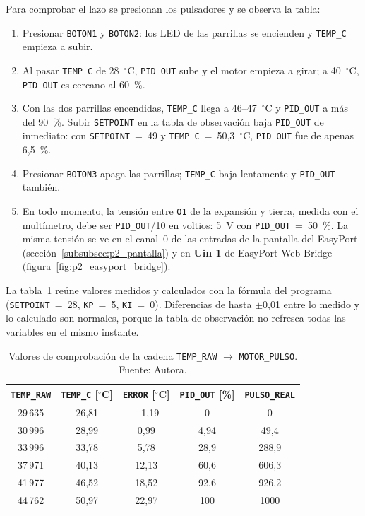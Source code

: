 \documentclass[12pt,a4paper]{article}
\newcommand{\ui}[1]{\textcolor{DeepBlue}{\textsf{\textbf{#1}}}}
\begin{document}
Para comprobar el lazo se presionan los pulsadores y se observa la tabla:

\begin{enumerate}
    \item Presionar \texttt{BOTON1} y \texttt{BOTON2}: los LED de las
    parrillas se encienden y \texttt{TEMP\_C} empieza a subir.
    \item Al pasar \texttt{TEMP\_C} de 28~$^\circ$C, \texttt{PID\_OUT} sube
    y el motor empieza a girar; a 40~$^\circ$C, \texttt{PID\_OUT} es
    cercano al 60~\%.
    \item Con las dos parrillas encendidas, \texttt{TEMP\_C} llega a
    46--47~$^\circ$C y \texttt{PID\_OUT} a más del 90~\%. Subir
    \texttt{SETPOINT} en la tabla de observación baja \texttt{PID\_OUT} de
    inmediato: con \texttt{SETPOINT}~=~49 y
    \texttt{TEMP\_C}~=~50,3~$^\circ$C, \texttt{PID\_OUT} fue de apenas
    6,5~\%.
    \item Presionar \texttt{BOTON3} apaga las parrillas; \texttt{TEMP\_C}
    baja lentamente y \texttt{PID\_OUT} también.
    \item En todo momento, la tensión entre \texttt{O1} de la expansión y
    tierra, medida con el multímetro, debe ser \texttt{PID\_OUT}/10 en
    voltios: 5~V con \texttt{PID\_OUT}~=~50~\%. La misma tensión se ve en
    el canal~0 de las entradas de la pantalla del EasyPort
    (sección~\ref{subsubsec:p2_pantalla}) y en \ui{Uin 1} de EasyPort
    Web Bridge (figura~\ref{fig:p2_easyport_bridge}).
\end{enumerate}

La tabla~\ref{tab:p2_pruebas} reúne valores medidos y calculados con la
fórmula del programa (\texttt{SETPOINT}~=~28, \texttt{KP}~=~5,
\texttt{KI}~=~0). Diferencias de hasta $\pm$0,01 entre lo medido y lo
calculado son normales, porque la tabla de observación no refresca todas
las variables en el mismo instante.

\begin{table}[H]
\centering
\caption{Valores de comprobación de la cadena \texttt{TEMP\_RAW} $\to$
\texttt{MOTOR\_PULSO}. Fuente: Autora.}
\label{tab:p2_pruebas}
\renewcommand{\arraystretch}{1.3}
\begin{tabular}{c c c c c}
\toprule
\textbf{\texttt{TEMP\_RAW}} & \textbf{\texttt{TEMP\_C} [$^\circ$C]} & \textbf{\texttt{ERROR} [$^\circ$C]} & \textbf{\texttt{PID\_OUT} [\%]} & \textbf{\texttt{PULSO\_REAL}} \\
\midrule
29\,635 & 26,81 & $-$1,19 & 0    & 0 \\
30\,996 & 28,99 & 0,99    & 4,94 & 49,4 \\
33\,996 & 33,78 & 5,78    & 28,9 & 288,9 \\
37\,971 & 40,13 & 12,13   & 60,6 & 606,3 \\
41\,977 & 46,52 & 18,52   & 92,6 & 926,2 \\
44\,762 & 50,97 & 22,97   & 100  & 1000 \\
\bottomrule
\end{tabular}
\end{table}
\end{document}
